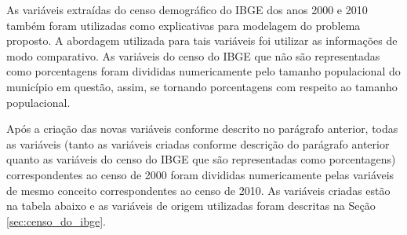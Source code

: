 As variáveis extraídas do censo demográfico do IBGE dos anos 2000 e 2010 também foram utilizadas como explicativas para modelagem do problema proposto. A abordagem utilizada para tais variáveis foi utilizar as informações de modo comparativo. As variáveis do censo do IBGE que não são representadas como porcentagens foram divididas numericamente pelo tamanho populacional do município em questão, assim, se tornando porcentagens com respeito ao tamanho populacional.

Após a criação das novas variáveis conforme descrito no parágrafo anterior, todas as variáveis (tanto as variáveis criadas conforme descrição do parágrafo anterior quanto as variáveis do censo do IBGE que são representadas como porcentagens) correspondentes ao censo de 2000 foram divididas numericamente pelas variáveis de mesmo conceito correspondentes ao censo de 2010. As variáveis criadas estão na tabela abaixo e as variáveis de origem utilizadas foram descritas na Seção \ref{sec:censo_do_ibge}.

